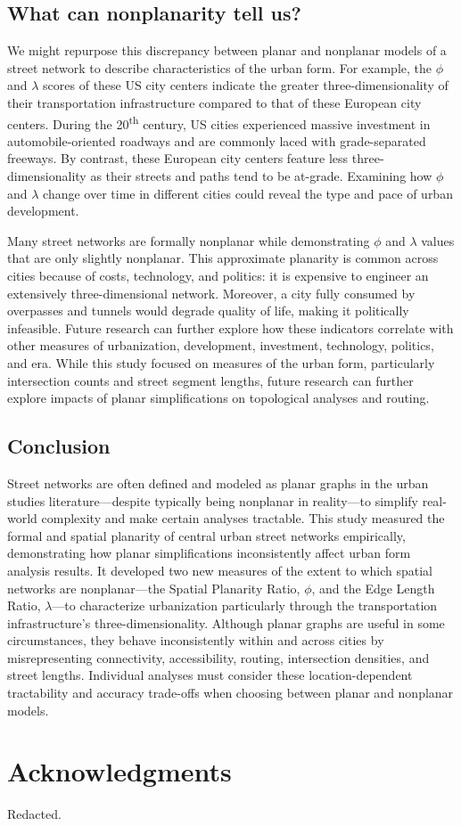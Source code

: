 \documentclass[Afour,doublespace,sageh,times]{sagej}
\begin{document}
\subsection{What can nonplanarity tell us?}

We might repurpose this discrepancy between planar and nonplanar models of a street network to describe characteristics of the urban form. For example, the $\phi$ and $\lambda$ scores of these US city centers indicate the greater three-dimensionality of their transportation infrastructure compared to that of these European city centers. During the 20\textsuperscript{th} century, US cities experienced massive investment in automobile-oriented roadways and are commonly laced with grade-separated freeways. By contrast, these European city centers feature less three-dimensionality as their streets and paths tend to be at-grade. Examining how $\phi$ and $\lambda$ change over time in different cities could reveal the type and pace of urban development.

Many street networks are formally nonplanar while demonstrating $\phi$ and $\lambda$ values that are only slightly nonplanar. This approximate planarity is common across cities because of costs, technology, and politics: it is expensive to engineer an extensively three-dimensional network. Moreover, a city fully consumed by overpasses and tunnels would degrade quality of life, making it politically infeasible. Future research can further explore how these indicators correlate with other measures of urbanization, development, investment, technology, politics, and era. While this study focused on measures of the urban form, particularly intersection counts and street segment lengths, future research can further explore impacts of planar simplifications on topological analyses and routing.

\subsection{Conclusion}

Street networks are often defined and modeled as planar graphs in the urban studies literature---despite typically being nonplanar in reality---to simplify real-world complexity and make certain analyses tractable. This study measured the formal and spatial planarity of central urban street networks empirically, demonstrating how planar simplifications inconsistently affect urban form analysis results. It developed two new measures of the extent to which spatial networks are nonplanar---the Spatial Planarity Ratio, $\phi$, and the Edge Length Ratio, $\lambda$---to characterize urbanization particularly through the transportation infrastructure's three-dimensionality. Although planar graphs are useful in some circumstances, they behave inconsistently within and across cities by misrepresenting connectivity, accessibility, routing, intersection densities, and street lengths. Individual analyses must consider these location-dependent tractability and accuracy trade-offs when choosing between planar and nonplanar models.



\section{Acknowledgments}

Redacted.




\end{document}

